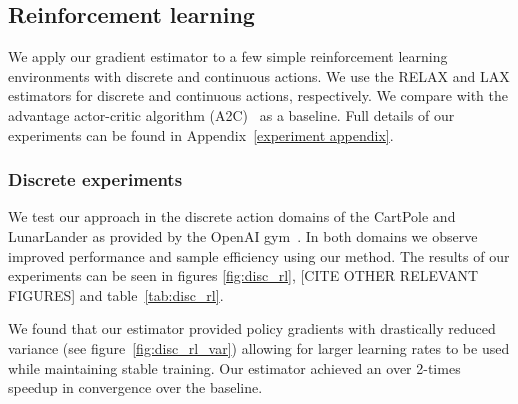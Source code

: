 \documentclass{article}
\newcommand{\LAX}{{\textnormal{LAX}}}
\newcommand{\RELAX}{{\textnormal{RELAX}}}
\begin{document}
\subsection{Reinforcement learning}
We apply our gradient estimator to a few simple reinforcement learning environments with discrete and continuous actions.
We use the \RELAX{} and \LAX{} estimators for discrete and continuous actions, respectively.
We compare with the advantage actor-critic algorithm (A2C)~\cite{sutton2000policy} as a baseline. Full details of our experiments can be found in Appendix~\ref{experiment appendix}.



\subsubsection{Discrete experiments}
We test our approach in the discrete action domains of the CartPole and LunarLander as provided by the OpenAI gym~\cite{1606.01540}. In both domains we observe improved performance and sample efficiency using our method. The results of our experiments can be seen in figures \ref{fig:disc_rl}, [CITE OTHER RELEVANT FIGURES] and table~\ref{tab:disc_rl}.

We found that our estimator provided policy gradients with drastically reduced variance (see figure~\ref{fig:disc_rl_var}) allowing for larger learning rates to be used while maintaining stable training. Our estimator achieved an over 2-times speedup in convergence over the baseline.

\end{document}
